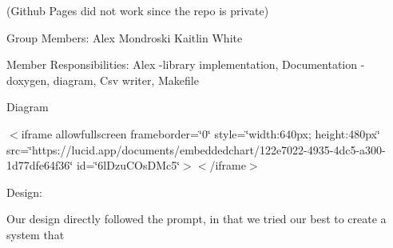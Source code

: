 \label{index_md_README}%
%
 (Github Pages did not work since the repo is private)

Group Members\+: Alex Mondroski Kaitlin White

Member Responsibilities\+: Alex -\/library implementation, Documentation -\/ doxygen, diagram, Csv writer, Makefile

Diagram

$<$iframe allowfullscreen frameborder=\char`\"{}0\char`\"{} style=\char`\"{}width\+:640px; height\+:480px\char`\"{} src=\char`\"{}https\+://lucid.\+app/documents/embeddedchart/122e7022-\/4935-\/4dc5-\/a300-\/1d77dfe64f36\char`\"{} id=\char`\"{}6l\+Dzu\+COs\+DMc5\char`\"{}$>$$<$/iframe$>$

Design\+:

Our design directly followed the prompt, in that we tried our best to create a system that ~\newline
 